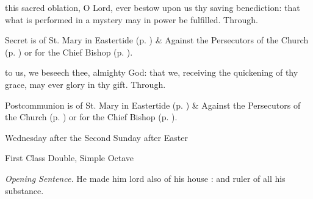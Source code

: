 \secret\label{EasterIISecret}
 this sacred oblation, O Lord, ever bestow upon us thy saving benediction: that what is performed in a mystery may in power be fulfilled. Through.
\begin{rubric}
     Secret is of St. Mary in Eastertide (p. \pageref{SPMaryInEaster}) \&  Against the Persecutors of the Church (p. \pageref{SPAgainst}) or for the Chief Bishop (p. \pageref{SPChiefBishop}).
\end{rubric}
\postcommunion\label{EasterIIPostcommunion}
 to us, we beseech thee, almighty God: that we, receiving the quickening of thy grace, may ever glory in thy gift. Through.
\begin{rubric}
     Postcommunion is of St. Mary in Eastertide (p. \pageref{SPMaryInEaster}) \&  Against the Persecutors of the Church (p. \pageref{SPAgainst}) or for the Chief Bishop (p. \pageref{SPChiefBishop}).
\end{rubric}

\begin{inhead}
    {Wednesday after the Second Sunday after Easter}\par
    {First Class Double, Simple Octave}
\end{inhead}
\par\noindent
\textit{Opening Sentence.} He made him lord also of his house : and ruler of all his substance.


